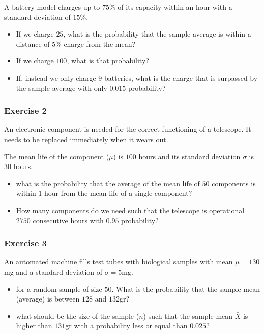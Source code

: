 \documentclass[
]{book}
\begin{document}
A battery model charges up to \(75\%\) of its capacity within an hour with a standard deviation of \(15\%\).

\begin{itemize}
\item
  If we charge \(25\), what is the probability that the sample average is within a distance of \(5\%\) charge from the mean?
\item
  If we charge \(100\), what is that probability?
\item
  If, instead we only charge \(9\) batteries, what is the charge that is surpassed by the sample average with only \(0.015\) probability?
\end{itemize}

\hypertarget{exercise-2-6}{%
\subsubsection{Exercise 2}\label{exercise-2-6}}

An electronic component is needed for the correct functioning of a telescope. It needs to be replaced immediately when it wears out.

The mean life of the component (\(\mu\)) is \(100\) hours and its standard deviation \(\sigma\) is \(30\) hours.

\begin{itemize}
\item
  what is the probability that the average of the mean life of \(50\) components is within \(1\) hour from the mean life of a single component?
\item
  How many components do we need such that the telescope is operational \(2750\) consecutive hours with \(0.95\) probability?
\end{itemize}

\hypertarget{exercise-3-3}{%
\subsubsection{Exercise 3}\label{exercise-3-3}}

An automated machine fills test tubes with biological samples with mean \(\mu=130\)mg and a standard deviation of \(\sigma=5\)mg.

\begin{itemize}
\item
  for a random sample of size \(50\). What is the probability that
  the sample mean (average) is between \(128\) and \(132\)gr?
\item
  what should be the size of the sample (\(n\)) such that the sample mean \(\bar{X}\) is higher than \(131\)gr with a probability less or equal than \(0.025\)?
\end{itemize}
\end{document}
